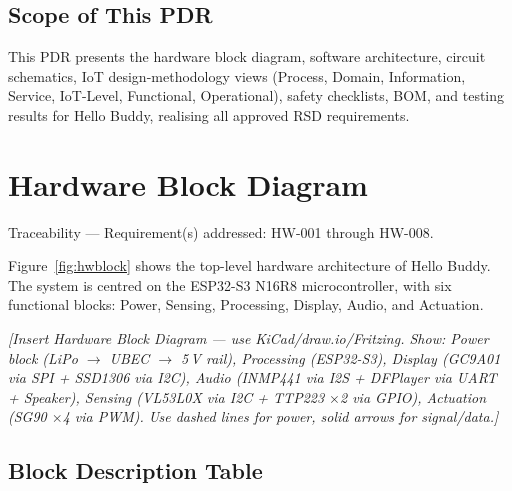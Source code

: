\documentclass[12pt,a4paper]{article}
\begin{document}
\subsection{Scope of This PDR}

This PDR presents the hardware block diagram, software architecture,
circuit schematics, IoT design-methodology views (Process, Domain,
Information, Service, IoT-Level, Functional, Operational), safety
checklists, BOM, and testing results for Hello Buddy, realising all
approved RSD requirements.

\newpage
\section{Hardware Block Diagram}

\begin{tracebox}
Traceability --- Requirement(s) addressed: HW-001 through HW-008.
\end{tracebox}

\vspace{0.3cm}

Figure~\ref{fig:hwblock} shows the top-level hardware architecture of
Hello Buddy. The system is centred on the ESP32-S3 N16R8 microcontroller,
with six functional blocks: Power, Sensing, Processing, Display,
Audio, and Actuation.

\vspace{0.5cm}
\begin{center}
\textit{[Insert Hardware Block Diagram --- use KiCad/draw.io/Fritzing.
Show: Power block (LiPo $\rightarrow$ UBEC $\rightarrow$ 5\,V rail),
Processing (ESP32-S3), Display (GC9A01 via SPI + SSD1306 via I2C),
Audio (INMP441 via I2S + DFPlayer via UART + Speaker), Sensing
(VL53L0X via I2C + TTP223 $\times$2 via GPIO), Actuation
(SG90 $\times$4 via PWM). Use dashed lines for power, solid arrows
for signal/data.]}
\end{center}
\vspace{0.3cm}
\label{fig:hwblock}

\vspace{0.5cm}

\subsection{Block Description Table}
\end{document}
